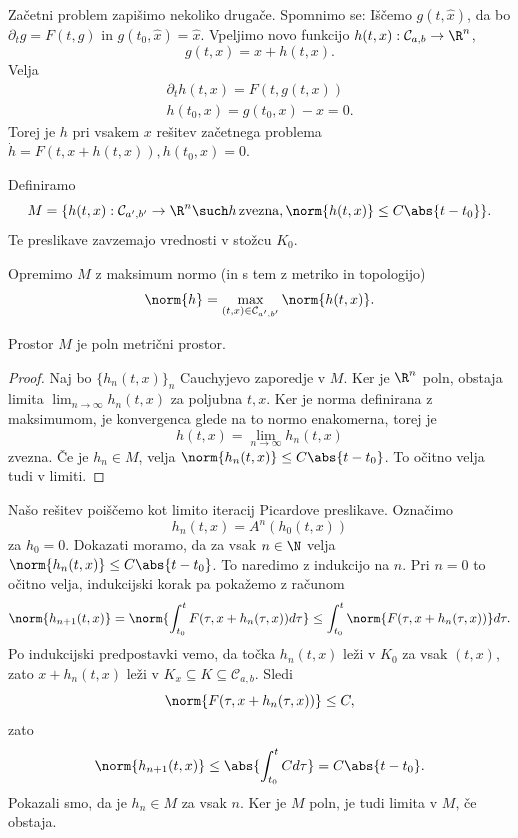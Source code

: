 Začetni problem zapišimo nekoliko drugače.
Spomnimo se:
Iščemo $g(t, \hat{x})$, da bo $\partial_t g = F(t, g)$ in $g(t_0, \hat{x}) =
\hat{x}$.
Vpeljimo novo funkcijo $h(t, x) : \mathcal{C}_{a,b} \to \R^n$,
\[
  g(t, x) = x + h(t, x).
\]
Velja
\begin{gather*}
  \partial_t h(t, x) = F(t, g(t, x)) \\
  h(t_0, x) = g(t_0, x) - x = 0.
\end{gather*}
Torej je $h$ pri vsakem $x$ rešitev začetnega problema $\dot{h} = F(t,
x+h(t,x)), h(t_0, x) = 0$.

Definiramo
\[
  M = \{ h(t, x) : \mathcal{C}_{a',b'} \to \R^n \such h\,\text{zvezna},
  \norm{h(t,x)} \le C \abs{t-t_0} \}.
\]
Te preslikave zavzemajo vrednosti v stožcu $K_0$.


Opremimo $M$ z maksimum normo (in s tem z metriko in topologijo)
\[
  \norm{h} = \max_{(t,x) \in \mathcal{C}_{a',b'}} \norm{h(t,x)}.
\]

\begin{trditev}
  Prostor $M$ je poln metrični prostor.
\end{trditev}

\begin{proof}
  Naj bo $\{h_n(t, x)\}_n$ Cauchyjevo zaporedje v $M$.
  Ker je $\R^n$ poln, obstaja limita $\lim_{n \to \infty} h_n(t, x)$ za poljubna
  $t, x$.
  Ker je norma definirana z maksimumom, je konvergenca glede na to normo
  enakomerna, torej je
  \[
	h(t, x) = \lim_{n \to \infty} h_n(t, x)
  \]
  zvezna.
  Če je $h_n \in M$, velja $\norm{h_n(t,x)} \le C \abs{t-t_0}$.
  To očitno velja tudi v limiti.
\end{proof}


Našo rešitev poiščemo kot limito iteracij Picardove preslikave.
Označimo
\[
  h_n(t, x) = A^n(h_0(t,x))
\]
za $h_0 = 0$.
Dokazati moramo, da za vsak $n \in \N$ velja $\norm{h_n(t,x)} \le C
\abs{t-t_0}$.
To naredimo z indukcijo na $n$.
Pri $n = 0$ to očitno velja, indukcijski korak pa pokažemo z računom
\[
  \norm{h_{n+1}(t,x)}
  = \norm{ \int_{t_0}^t F(\tau, x+h_n(\tau,x)) d\tau }
  \le \int_{t_0}^t \norm{F(\tau, x+h_n(\tau,x))} d\tau.
\]
Po indukcijski predpostavki vemo, da točka $h_n(t,x)$ leži v $K_0$ za vsak
$(t,x)$, zato $x+h_n(t,x)$ leži v $K_x \subseteq K \subseteq
\mathcal{C}_{a,b}$.
Sledi
\[
  \norm{F(\tau, x+h_n(\tau, x))} \le C,
\]
zato
\[
  \norm{h_{n+1}(t,x)}
  \le \abs{\int_{t_0}^t C d\tau} = C \abs{t-t_0}.
\]
Pokazali smo, da je $h_n \in M$ za vsak $n$.
Ker je $M$ poln, je tudi limita v $M$, če obstaja.


